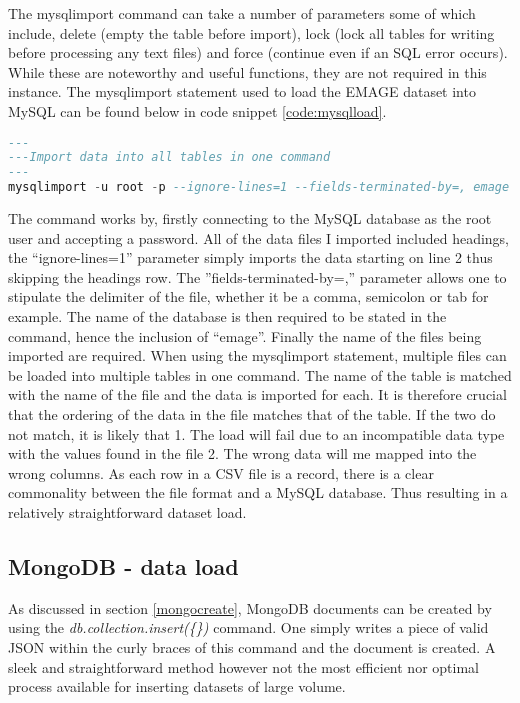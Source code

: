 The mysqlimport command can take a number of parameters some of which include, delete (empty the table before import), lock (lock all tables for writing before processing any text files) and force (continue even if an SQL error occurs). While these are noteworthy and useful functions, they are not required in this instance. The mysqlimport statement used to load the EMAGE dataset into MySQL can be found below in code snippet \ref{code:mysqlload}.
\begin{lstlisting}[language=SQL, caption=Command used to load data into the MySQL database., label=code:mysqlload]
---
---Import data into all tables in one command
---
mysqlimport -u root -p --ignore-lines=1 --fields-terminated-by=, emage assays.csv publications.csv sources.csv specimens.csv stages.csv textannotations.csv genes.csv anatomystructures.csv
\end{lstlisting}
\parindent 0pt
The command works by, firstly connecting to the MySQL database as the root user and accepting a password. All of the data files I imported included headings, the ``ignore-lines=1'' parameter simply imports the data starting on line 2 thus skipping the headings row. The ''fields-terminated-by=,'' parameter allows one to stipulate the delimiter of the file, whether it be a comma, semicolon or tab for example. The name of the database is then required to be stated in the command, hence the inclusion of ``emage''. Finally the name of the files being imported are required. When using the mysqlimport statement, multiple files can be loaded into multiple tables in one command. The name of the table is matched with the name of the file and the data is imported for each. It is therefore crucial that the ordering of the data in the file matches that of the table. If the two do not match, it is likely that 1. The load will fail due to an incompatible data type with the values found in the file 2. The wrong data will me mapped into the wrong columns. As each row in a CSV file is a record, there is a clear commonality between the file format and a MySQL database. Thus resulting in a relatively straightforward dataset load.
\parindent 15pt

\subsection{MongoDB - data load}\label{mongoload}
As discussed in section \ref{mongocreate}, MongoDB documents can be created by using the \textit{db.collection.insert(\{\})} command. One simply writes a piece of valid JSON within the curly braces of this command and the document is created. A sleek and straightforward method however not the most efficient nor optimal process available for inserting datasets of large volume.

